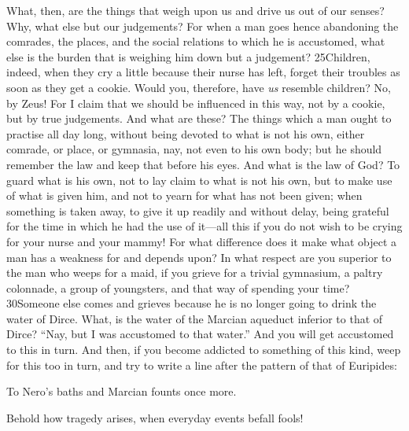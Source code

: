 What, then, are the things that weigh upon us and drive us out of our senses? Why, what else but our judgements? For when a man goes hence abandoning the comrades, the places, and the social relations to which he is accustomed, what else is the burden that is weighing him down but a judgement? 25Children, indeed, when they cry a little because their nurse has left, forget their troubles as soon as they get a cookie. Would you, therefore, have \emph{us} resemble children? No, by Zeus! For I claim that we should be influenced in this way, not by a cookie, but by true judgements. And what are these? The things which a man ought to practise all day long, without being devoted to what is not his own, either comrade, or place, or gymnasia, nay, not even to his own body; but he should remember the law and keep that before his eyes. And what is the law of God? To guard what is his own, not to lay claim to what is not his own, but to make use of what is given him, and not to yearn for what has not been given; when something is taken away, to give it up readily and without delay, being grateful for the time in which he had the use of it—all this if you do not wish to be crying for your nurse and your mammy! For what difference does it make what object a man has a weakness for and depends upon? In what respect are you superior to the man who weeps for a maid, if you grieve for a trivial gymnasium, a paltry colonnade, a group of youngsters, and that way of spending your time? 30Someone else comes and grieves because he is no longer going to drink the water of Dirce. What, is the water of the Marcian aqueduct inferior to that of Dirce? ``Nay, but I was accustomed to that water.'' And you will get accustomed to this in turn. And then, if you become addicted to something of this kind, weep for this too in turn, and try to write a line after the pattern of that of Euripides:

To Nero's baths and Marcian founts once more.

Behold how tragedy arises, when everyday events befall fools!

